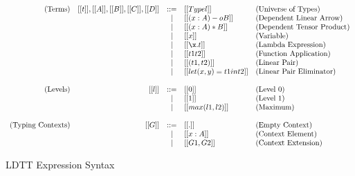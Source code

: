 
\begin{figure}
  \begin{center}
    \begin{math}
      \begin{array}{rrcll}
        \text{(Terms)} & [[t]], [[A]], [[B]], [[C]], [[D]]
         & ::= & [[Type l]]                   & \text{(Universe of Types)}\\
        &&  |  & [[( x : A ) -o B]]           & \text{(Dependent Linear Arrow)}\\
        &&  |  & [[( x : A ) * B]]            & \text{(Dependent Tensor Product)}\\
        &&  |  & [[x]]                        & \text{(Variable)}\\
        &&  |  & [[\x.t]]                     & \text{(Lambda Expression)}\\
        &&  |  & [[t1 t2]]                    & \text{(Function Application)}\\
        &&  |  & [[(t1 , t2)]]                & \text{(Linear Pair)}\\
        &&  |  & [[let ( x , y ) = t1 in t2]] & \text{(Linear Pair Eliminator)}\\
        \\
        \text{(Levels)} & [[l]] 
        & ::= & [[0]]                  & \text{(Level $0$)}\\
        && |  & [[1]]                  & \text{(Level $1$)}\\
        && |  & [[max(l1,l2)]]         & \text{(Maximum)}\\
        \\
        \text{(Typing Contexts)} & [[G]] 
        & ::= & [[.]]                  & \text{(Empty Context)}\\
        && |  & [[x:A]]                & \text{(Context Element)}\\
        && |  & [[G1,G2]]              & \text{(Context Extension)}\\
      \end{array}
    \end{math}
  \end{center}
  \caption{LDTT Expression Syntax}
  \label{fig:ldtt-syntax}
\end{figure}

